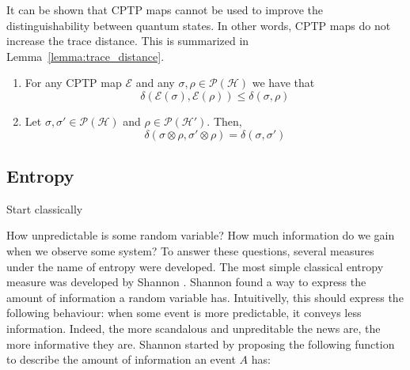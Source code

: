 It can be shown that CPTP maps cannot be used to improve the distinguishability between quantum states. In other words, CPTP maps do not increase the trace distance. This is summarized in Lemma~\ref{lemma:trace_distance}.




\begin{lemma}

\begin{enumerate}

    The trace distance has the following properties:

    \item For any CPTP map $\mathcal{E}$ and any $\sigma, \rho \in \mathcal{P}(\mathcal{H})$ we have that
    $$\delta(\mathcal{E}(\sigma), \mathcal{E}(\rho)) \leq \delta(\sigma, \rho)$$
    
    \item Let $\sigma, \sigma' \in \mathcal{P}(\mathcal{H})$ and $\rho \in \mathcal{P}(\mathcal{H}')$. Then,
    $$\delta(\sigma\otimes \rho, \sigma'\otimes \rho) = \delta(\sigma, \sigma')$$
\end{enumerate}

\label{lemma:trace_distance}
\end{lemma}


\subsection{Entropy}

{\cv Start classically}

How unpredictable is some random variable? How much information do we gain when we observe some system? To answer these questions, several measures under the name of entropy were developed. The most simple classical entropy measure was developed by Shannon \cite{this}. Shannon found a way to express the amount of information a random variable has. Intuitivelly, this should express the following behaviour: when some event is more predictable, it conveys less information. Indeed, the more scandalous and unpreditable the news are, the more informative they are. Shannon started by proposing the following function to describe the amount of information an event $A$ has:

